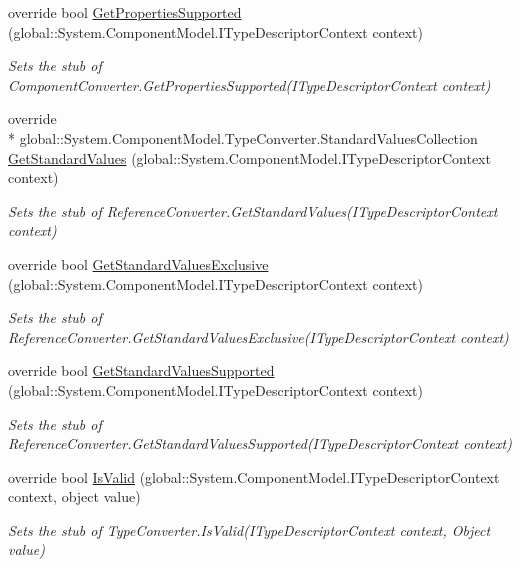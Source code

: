 \begin{DoxyCompactItemize}
override bool \hyperlink{class_system_1_1_component_model_1_1_fakes_1_1_stub_component_converter_a8e7131892e976c4aa839809b5bd15d28}{Get\-Properties\-Supported} (global\-::\-System.\-Component\-Model.\-I\-Type\-Descriptor\-Context context)
\begin{DoxyCompactList}\small\item\em Sets the stub of Component\-Converter.\-Get\-Properties\-Supported(\-I\-Type\-Descriptor\-Context context)\end{DoxyCompactList}\item 
override \\*
global\-::\-System.\-Component\-Model.\-Type\-Converter.\-Standard\-Values\-Collection \hyperlink{class_system_1_1_component_model_1_1_fakes_1_1_stub_component_converter_aea4d3d62d288f8aadd3a47ae6bf04cb0}{Get\-Standard\-Values} (global\-::\-System.\-Component\-Model.\-I\-Type\-Descriptor\-Context context)
\begin{DoxyCompactList}\small\item\em Sets the stub of Reference\-Converter.\-Get\-Standard\-Values(\-I\-Type\-Descriptor\-Context context)\end{DoxyCompactList}\item 
override bool \hyperlink{class_system_1_1_component_model_1_1_fakes_1_1_stub_component_converter_ab3bc8fc44d703e92a65350e28940c0cd}{Get\-Standard\-Values\-Exclusive} (global\-::\-System.\-Component\-Model.\-I\-Type\-Descriptor\-Context context)
\begin{DoxyCompactList}\small\item\em Sets the stub of Reference\-Converter.\-Get\-Standard\-Values\-Exclusive(\-I\-Type\-Descriptor\-Context context)\end{DoxyCompactList}\item 
override bool \hyperlink{class_system_1_1_component_model_1_1_fakes_1_1_stub_component_converter_a0ae94a13da0b7093544157caacd0c048}{Get\-Standard\-Values\-Supported} (global\-::\-System.\-Component\-Model.\-I\-Type\-Descriptor\-Context context)
\begin{DoxyCompactList}\small\item\em Sets the stub of Reference\-Converter.\-Get\-Standard\-Values\-Supported(\-I\-Type\-Descriptor\-Context context)\end{DoxyCompactList}\item 
override bool \hyperlink{class_system_1_1_component_model_1_1_fakes_1_1_stub_component_converter_aa0dd646f9fc6b149d66befeabd254f60}{Is\-Valid} (global\-::\-System.\-Component\-Model.\-I\-Type\-Descriptor\-Context context, object value)
\begin{DoxyCompactList}\small\item\em Sets the stub of Type\-Converter.\-Is\-Valid(\-I\-Type\-Descriptor\-Context context, Object value)\end{DoxyCompactList}\end{DoxyCompactItemize}
